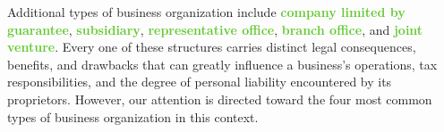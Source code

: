 \documentclass[twoside]{article}
\newcommand{\highlightgreentext}[1]{\textcolor[HTML]{62C92F}{\textbf{#1}}}
\numberwithin{equation}{section}
\begin{document}
	Additional types of business organization include \highlightgreentext{company limited by guarantee}, \highlightgreentext{subsidiary}, \highlightgreentext{representative office}, \highlightgreentext{branch office}, and \highlightgreentext{joint venture}. Every one of these structures carries distinct legal consequences, benefits, and drawbacks that can greatly influence a business's operations, tax responsibilities, and the degree of personal liability encountered by its proprietors. However, our attention is directed toward the four most common types of business organization in this context.
\end{document}
